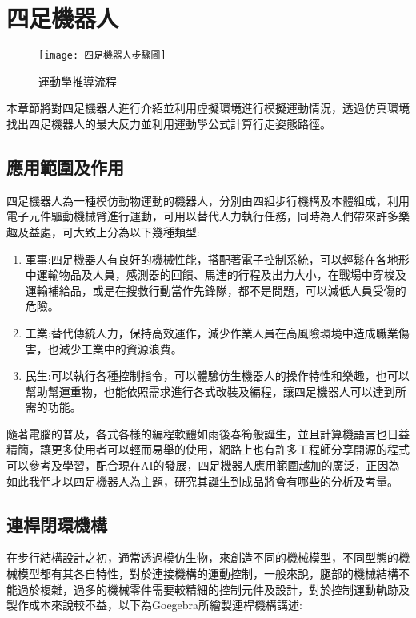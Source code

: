 
\chapter{四足機器人}
\begin{figure}[hbt!]
\begin{center}
\texttt{[image: 四足機器人步驟圖]}
\caption{\Large 運動學推導流程}\label{四足機器人步驟圖}
\end{center}
\end{figure}
本章節將對四足機器人進行介紹並利用虛擬環境進行模擬運動情況，透過仿真環境找出四足機器人的最大反力並利用運動學公式計算行走姿態路徑。\\

\section{應用範圍及作用}


四足機器人為一種模仿動物運動的機器人，分別由四組步行機構及本體組成，利用電子元件驅動機械臂進行運動，可用以替代人力執行任務，同時為人們帶來許多樂趣及益處，可大致上分為以下幾種類型:\\

\begin{enumerate}
\item 軍事:四足機器人有良好的機械性能，搭配著電子控制系統，可以輕鬆在各地形中運輸物品及人員，感測器的回饋、馬達的行程及出力大小，在戰場中穿梭及運輸補給品，或是在搜救行動當作先鋒隊，都不是問題，可以減低人員受傷的危險。\
\item 工業:替代傳統人力，保持高效運作，減少作業人員在高風險環境中造成職業傷害，也減少工業中的資源浪費。\
\item 民生:可以執行各種控制指令，可以體驗仿生機器人的操作特性和樂趣，也可以幫助幫運重物，也能依照需求進行各式改裝及編程，讓四足機器人可以達到所需的功能。\
\end{enumerate}
\newpage

隨著電腦的普及，各式各樣的編程軟體如雨後春筍般誕生，並且計算機語言也日益精簡，讓更多使用者可以輕而易舉的使用，網路上也有許多工程師分享開源的程式可以參考及學習，配合現在AI的發展，四足機器人應用範圍越加的廣泛，正因為如此我們才以四足機器人為主題，研究其誕生到成品將會有哪些的分析及考量。\\

\section{連桿閉環機構}
在步行結構設計之初，通常透過模仿生物，來創造不同的機械模型，不同型態的機械模型都有其各自特性，對於連接機構的運動控制，一般來說，腿部的機械結構不能過於複雜，過多的機械零件需要較精細的控制元件及設計，對於控制運動軌跡及製作成本來說較不益，以下為Goegebra所繪製連桿機構講述:\\

